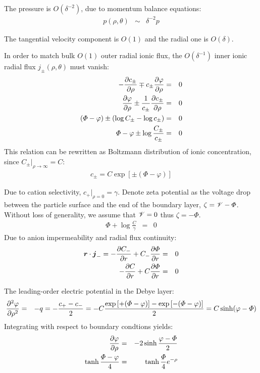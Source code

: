 The pressure is $O(\delta^{-2})$, due to momentum balance equations:
\begin{eqnarray}
p(\rho, \theta) &\sim& \delta^{-2} p
\end{eqnarray}

The tangential velocity component is $O(1)$ and the radial one is $O(\delta)$.

In order to match bulk $O(1)$ outer radial ionic flux, 
the $O(\delta^{-1})$ inner ionic radial flux $j_\pm(\rho, \theta)$ must vanish:
\begin{eqnarray}
-\frac{\partial c_\pm}{\partial \rho} \mp c_\pm \frac{\partial \varphi}{\partial \rho} &=& 0 \\
\frac{\partial \varphi}{\partial \rho} \pm\frac{1}{c_\pm}\frac{\partial c_\pm}{\partial \rho} &=& 0 \\
\left(\varPhi - \varphi\right) \pm\left(\log C_\pm - \log c_\pm\right) &=& 0 \\
\varPhi - \varphi \pm \log \frac{C_\pm}{c_\pm} &=& 0
\end{eqnarray}
This relation can be rewritten as Boltzmann distribution of ionic concentration,
since $C_\pm|_{\rho\rightarrow\infty} = C$:
\begin{eqnarray}
c_\pm = C \exp\left[\pm(\varPhi - \varphi)\right]
\end{eqnarray}

Due to cation selectivity, $c_+|_{\rho=0} = \gamma$.
Denote zeta potential as the voltage drop between the particle surface and the end of
the boundary layer, $\zeta = \mathscr{V} - \varPhi$. Without loss of generality, we assume that 
$\mathscr{V} = 0$ thus $\zeta = -\varPhi$.
\begin{eqnarray}
\varPhi + \log\frac{C}{\gamma}&=& 0
\end{eqnarray}
Due to anion impermeability and radial flux continuity:
\begin{eqnarray}
\boldsymbol{r} \cdot \boldsymbol{j}_- = -\frac{\partial C_-}{\partial r} + C_- \frac{\partial \varPhi}{\partial r} &=& 0 \\
-\frac{\partial C}{\partial r} + C \frac{\partial \varPhi}{\partial r} &=& 0
\end{eqnarray}

The leading-order electric potential in the Debye layer:
\begin{eqnarray}
\frac{\partial ^2 \varphi}{\partial \rho^2} &=& -q = -\frac{c_+ - c_-}{2} = 
-C\frac{\exp\left[+(\varPhi - \varphi)\right] - \exp\left[-(\varPhi - \varphi)\right]}{2} = 
C \sinh(\varphi - \varPhi)
\end{eqnarray}
Integrating with respect to boundary condtions yields:
\begin{eqnarray}
\frac{\partial \varphi}{\partial \rho} &=& -2\sinh\frac{\varphi - \varPhi}{2} \\
\tanh\frac{\varPhi - \varphi}{4} &=& \tanh\frac{\varPhi}{4} e^{-\rho}
\end{eqnarray}


